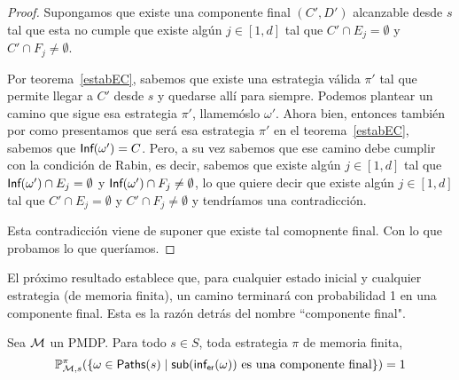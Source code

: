 \begin{proof}
	Supongamos que existe una componente final $(C', D')$ alcanzable desde $s$ tal que esta no cumple que existe algún $j \in [1, d]$ tal que $C' \cap E_j= \emptyset$ y $C' \cap F_j \neq \emptyset$.

	Por teorema~\ref{estabEC}, sabemos que existe una estrategia válida $\pi'$ tal
	que permite llegar a $C'$ desde $s$ y quedarse allí para siempre. Podemos
	plantear un camino que sigue esa estrategia $\pi'$, llamemóslo $\omega'$. Ahora
	bien, entonces también por como presentamos que será esa estrategia $\pi'$ en
	el teorema~\ref{estabEC}, sabemos que $\textsf{Inf}(\omega') = C$. Pero, a su vez
	sabemos que ese camino debe cumplir con la condición de Rabin, es decir,
	sabemos que existe algún $j \in [1, d]$ tal que $\textsf{Inf}(\omega') \cap E_j =
		\emptyset$ y $\textsf{Inf}(\omega') \cap F_j \neq \emptyset$, lo que quiere decir que
	existe algún $j \in [1, d]$ tal que $C' \cap E_j= \emptyset$ y $C' \cap F_j
		\neq \emptyset$ y tendríamos una contradicción.

	Esta contradicción viene de suponer que existe tal comopnente final. Con lo que
	probamos lo que queríamos.
\end{proof}

El próximo resultado establece que, para cualquier estado inicial y cualquier
estrategia (de memoria finita), un camino terminará con probabilidad 1 en una
componente final. Esta es la razón detrás del nombre ``componente final".

\begin{theorem} \label{teoFundEC}
	Sea $\mathcal{M}$ un PMDP. Para todo $s \in S$, toda estrategia $\pi$ de memoria finita,
	$$\mathbb{P}^\pi_{\mathcal{M}, s}(\{ \omega \in \textsf{Paths}(s) \mid \textsf{sub}(\textsf{inf}_\textsf{er}(\omega)) \text{ es una componente final}\}) = 1$$
\end{theorem}

